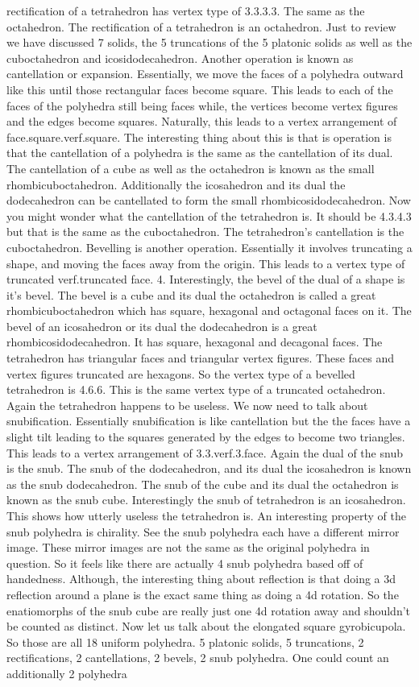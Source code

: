\documentclass{article}
\begin{document}
rectification of a tetrahedron has vertex type of 3.3.3.3. The same as the octahedron. The rectification of a tetrahedron is an octahedron. Just to review we have discussed 7 solids, the 5 truncations of the 5 platonic solids as well as the cuboctahedron and icosidodecahedron. Another operation is known as cantellation or expansion. Essentially, we move the faces of a polyhedra outward like this until those rectangular faces become square. This leads to each of the faces of the polyhedra still being faces while, the vertices become vertex figures and the edges become squares. Naturally, this leads to a vertex arrangement of face.square.verf.square. The interesting thing about this is that is operation is that the cantellation of a polyhedra is the same as the cantellation of its dual. The cantellation of a cube as well as the octahedron is known as the small rhombicuboctahedron. Additionally the icosahedron and its dual the dodecahedron can be cantellated to form the small rhombicosidodecahedron. Now you might wonder what the cantellation of the tetrahedron is. It should be 4.3.4.3 but that is the same as the cuboctahedron. The tetrahedron's cantellation is the cuboctahedron. Bevelling is another operation. Essentially it involves truncating a shape, and moving the faces away from the origin. This leads to a vertex type of truncated verf.truncated face. 4. Interestingly, the bevel of the dual of a shape is it's bevel. The bevel is a cube and its dual the octahedron is called a great rhombicuboctahedron which has square, hexagonal and octagonal faces on it. The bevel of an icosahedron or its dual the dodecahedron is a great rhombicosidodecahedron. It has square, hexagonal and decagonal faces. The tetrahedron has triangular faces and triangular vertex figures. These faces and vertex figures truncated are hexagons. So the vertex type of a bevelled tetrahedron is 4.6.6. This is the same vertex type of a truncated octahedron. Again the tetrahedron happens to be useless. We now need to talk about snubification. Essentially snubification is like cantellation but the the faces have a slight tilt leading to the squares generated by the edges to become two triangles. This leads to a vertex arrangement of 3.3.verf.3.face. Again the dual of the snub is the snub. The snub of the dodecahedron, and its dual the icosahedron is known as the snub dodecahedron. The snub of the cube and its dual the octahedron is known as the snub cube. Interestingly the snub of tetrahedron is an icosahedron. This shows how utterly useless the tetrahedron is. An interesting property of the snub polyhedra is chirality. See the snub polyhedra each have a different mirror image. These mirror images are not the same as the original polyhedra in question. So it feels like there are actually 4 snub polyhedra based off of handedness. Although, the interesting thing about reflection is that doing a 3d reflection around a plane is the exact same thing as doing a 4d rotation.  So the enatiomorphs of the snub cube are really just one 4d rotation away and shouldn't be counted as distinct. Now let us talk about the elongated square gyrobicupola. So those are all 18 uniform polyhedra. 5 platonic solids, 5 truncations, 2 rectifications, 2 cantellations, 2 bevels, 2 snub polyhedra. One could count an additionally 2 polyhedra 
\end{document}
